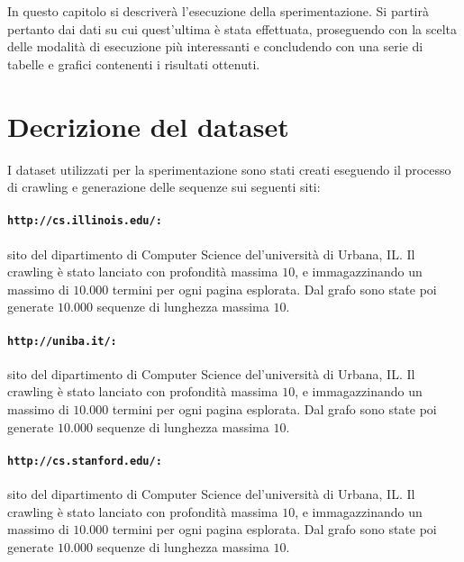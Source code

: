 

In questo capitolo si descriverà l'esecuzione della sperimentazione. Si partirà pertanto dai dati su cui quest'ultima è stata effettuata, proseguendo con la scelta delle modalità di esecuzione più interessanti e concludendo con una serie di tabelle e grafici contenenti i risultati ottenuti. 

\section{Decrizione del dataset}
I dataset utilizzati per la sperimentazione sono stati creati eseguendo il processo di crawling e generazione delle sequenze sui seguenti siti:

\paragraph{\texttt{http://cs.illinois.edu/:}} sito del dipartimento di Computer Science del'università di Urbana, IL. Il crawling è stato lanciato con profondità massima $10$, e immagazzinando un massimo di $10.000$ termini per ogni pagina esplorata. Dal grafo sono state poi generate $10.000$ sequenze di lunghezza massima $10$.

\paragraph{\texttt{http://uniba.it/:}} sito del dipartimento di Computer Science del'università di Urbana, IL. Il crawling è stato lanciato con profondità massima $10$, e immagazzinando un massimo di $10.000$ termini per ogni pagina esplorata. Dal grafo sono state poi generate $10.000$ sequenze di lunghezza massima $10$.

\paragraph{\texttt{http://cs.stanford.edu/:}} sito del dipartimento di Computer Science del'università di Urbana, IL. Il crawling è stato lanciato con profondità massima $10$, e immagazzinando un massimo di $10.000$ termini per ogni pagina esplorata. Dal grafo sono state poi generate $10.000$ sequenze di lunghezza massima $10$.

